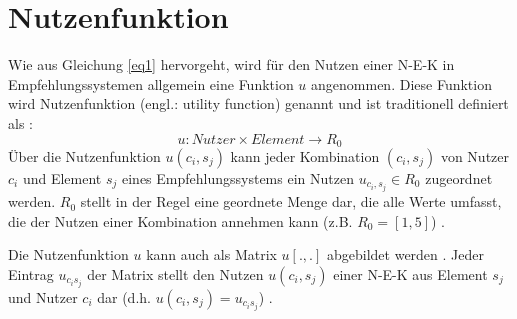 \section{Nutzenfunktion}
\label{ch:empfehlungssysteme:nutzenfunktion}
Wie aus Gleichung \ref{eq1} hervorgeht, wird für den Nutzen einer \ac{N-E-K} in Empfehlungssystemen allgemein eine Funktion $u$ angenommen.
Diese Funktion wird Nutzenfunktion (engl.: utility function) genannt und ist traditionell definiert als \cite[S. 195]{adomavicius:3:inbook}\cite[S. 1156]{gupta:inproceedings}\cite[S. 3]{jawaheer:article}\cite[S. 219]{lakiotaki:inproceedings}\cite[S. 3880]{nilashi:article}:
\begin{equation}\label{eq2}%
    u: Nutzer \times Element \rightarrow R_{0}
\end{equation}
Über die Nutzenfunktion $u(c_{i},s_{j})$ kann jeder Kombination $(c_{i},s_{j})$ von Nutzer $c_{i}$ und Element $s_{j}$ eines Empfehlungssystems ein Nutzen $u_{c_{i},s_{j}} \in R_{0}$ zugeordnet werden.
$R_{0}$ stellt in der Regel eine geordnete Menge dar, die alle Werte umfasst, die der Nutzen einer Kombination annehmen kann (z.B. $R_{0} = [1,5]$) \cite[S. 49]{adomavicius:inproceedings:2}.

Die Nutzenfunktion $u$ kann auch als Matrix $u[.,.]$ abgebildet werden \cite[S. 1]{dekhtyar:misc}.
Jeder Eintrag $u_{c_{i}s_{j}}$ der Matrix stellt den Nutzen $u(c_{i},s_{j})$ einer \ac{N-E-K} aus Element $s_{j}$ und Nutzer $c_{i}$ dar (d.h. $u(c_{i},s_{j}) = u_{c_{i}s_{j}}$) \cite[S. 1]{dekhtyar:misc}.

